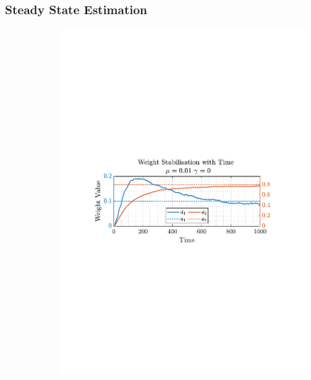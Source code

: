 \documentclass[12pt]{article}
\begin{document}
		\subsubsection{Steady State Estimation} 
			\begin{figure}[H]
				\centering
				\begin{subfigure}{0.49\textwidth}
					\centering
					\includegraphics[trim={2.2cm 11.2cm 3.00cm  11.2cm}, clip, width=\textwidth]{../MATLAB/figures/q2_1cd_fig02.pdf} 
					\captionsetup{justification=centering}
				\end{subfigure}
				\begin{subfigure}{0.49\textwidth}
					\centering

\end{subfigure}
\end{figure}
\end{document}
